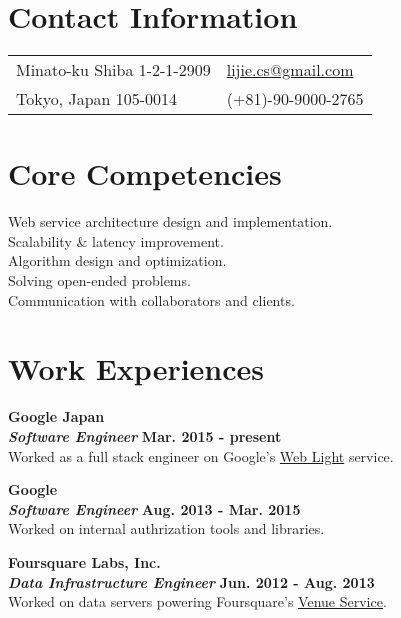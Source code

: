 \documentclass[margin,line]{res}
\begin{document}


\begin{resume}
\section{\sc Contact Information}
\vspace{.05in}
\begin{tabular}{@{}p{3in}p{3in}}
Minato-ku Shiba 1-2-1-2909 & \href{mailto:lijie.cs@gmail.com}{lijie.cs@gmail.com} \\
Tokyo, Japan 105-0014 & (+81)-90-9000-2765 \\
\end{tabular}

\section{\sc Core Competencies}
Web service architecture design and implementation.\\
Scalability \& latency improvement.\\
Algorithm design and optimization.\\
Solving open-ended problems.\\
Communication with collaborators and clients.

\section{\sc Work Experiences}
{\bf{Google Japan}}\\
{\bf{\em Software Engineer}} \hfill {\bf Mar. 2015 - present}\\
Worked as a full stack engineer on Google's \href{https://support.google.com/webmasters/answer/6211428?hl=en}{Web Light} service.

{\bf{Google}}\\
{\bf{\em Software Engineer}} \hfill {\bf Aug. 2013 - Mar. 2015}\\
Worked on internal authrization tools and libraries.

{\bf{Foursquare Labs, Inc.}}\\
{\bf{\em Data Infrastructure Engineer}} \hfill {\bf Jun. 2012 - Aug. 2013}\\
Worked on data servers powering Foursquare's \href{https://foursquare.com/dev/overview/venues}{Venue Service}.


\end{resume}
\end{document}
